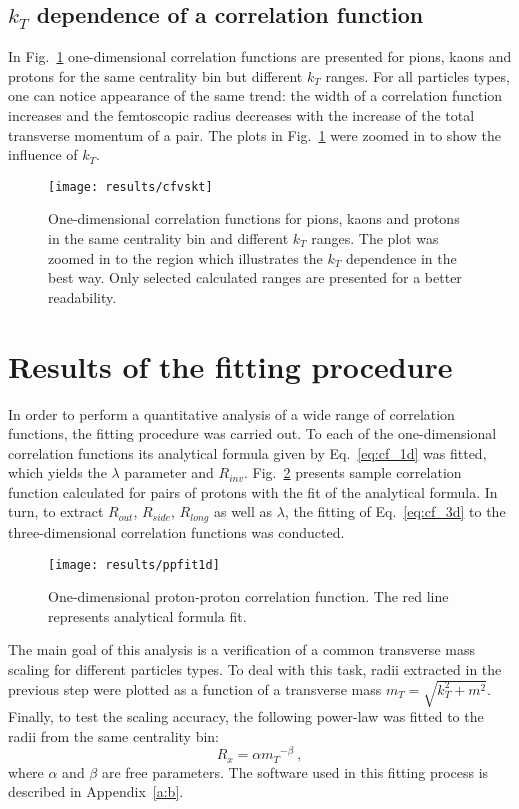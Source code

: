     \subsection{$k_T$ dependence of a correlation function}
      In Fig.~\ref{fig:kt_dep} one-dimensional correlation functions are presented for pions, kaons and protons for the same centrality bin but different $k_T$ ranges.
      For all particles types, one can notice appearance of the same trend: the width of a correlation function increases and the femtoscopic radius decreases with the increase of the total transverse momentum of a pair.
      The plots in Fig.~\ref{fig:kt_dep} were zoomed in to show the influence of $k_T$.

      \begin{figure}[h]
        \centering
        \centerline{\texttt{[image: results/cfvskt]}}
        \caption{One-dimensional correlation functions for pions, kaons and protons in the same centrality bin and different $k_T$ ranges. The plot was zoomed in to the region which illustrates the $k_T$ dependence in the best way. Only selected calculated ranges are presented for a better readability.}
      \label{fig:kt_dep}
      \end{figure}
    \FloatBarrier
    \clearpage
  \section{Results of the fitting procedure}
    In order to perform a quantitative analysis of a wide range of correlation functions, the fitting procedure was carried out.
    To each of the one-dimensional correlation functions its analytical formula given by Eq.~\ref{eq:cf_1d} was fitted, which yields the $\lambda$ parameter and $R_{inv}$.
    Fig.~\ref{fig:ppfit} presents sample correlation function calculated for pairs of protons with the fit of the analytical formula.
    In turn, to extract $R_{out}$, $R_{side}$, $R_{long}$ as well as $\lambda$, the fitting of Eq.~\ref{eq:cf_3d} to the three-dimensional correlation functions was conducted.
    \begin{figure}[h]
      \centering
      \centerline{\texttt{[image: results/ppfit1d]}}
      \caption{One-dimensional proton-proton correlation function. The red line represents analytical formula fit.}
    \label{fig:ppfit}
    \end{figure}

    The main goal of this analysis is a verification of a common transverse mass scaling for different particles types.
    To deal with this task, radii extracted in the previous step were plotted as a function of a transverse mass $m_T = \sqrt{k_T^2 +m^2}$.
    Finally, to test the scaling accuracy, the following power-law was fitted to the radii from the same centrality bin:
    \begin{equation}
      \label{eq:power-law}
      R_x = \alpha {m_T}^{-\beta}~,
    \end{equation}
    where $\alpha$ and $\beta$ are free parameters.
    The software used in this fitting process is described in Appendix~\ref{a:b}.
